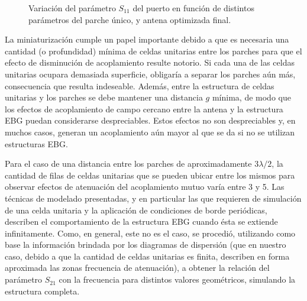 \begin{figure}[h]
	\centering 
	\hspace{30pt}
	\hspace{30pt}
	\hspace{30pt}
	\caption{Variación del parámetro $S_{11}$ del puerto en función de distintos parámetros del parche único, y antena optimizada final.}
	\label{fig:simulaciones-microstrip-1parche}
\end{figure}

La miniaturización cumple un papel importante debido a que es necesaria una cantidad (o profundidad) mínima de celdas unitarias entre los parches para que el efecto de disminución de acoplamiento resulte notorio. Si cada una de las celdas unitarias ocupara demasiada superficie, obligaría a separar los parches aún más, consecuencia que resulta indeseable. Además, entre la estructura de celdas unitarias y los parches se debe mantener una distancia $g$ mínima, de modo que los efectos de acoplamiento de campo cercano entre la antena y la estructura EBG puedan considerarse despreciables. Estos efectos no son despreciables y, en muchos casos, generan un acoplamiento aún mayor al que se da si no se utilizan estructuras EBG.

Para el caso de una distancia entre los parches de aproximadamente $3\lambda/2$, la cantidad de filas de celdas unitarias que se pueden ubicar entre los mismos para observar efectos de atenuación del acoplamiento mutuo varía entre 3 y 5. Las técnicas de modelado presentadas, y en particular las que requieren de simulación de una celda unitaria y la aplicación de condiciones de borde periódicas, describen el comportamiento de la estructura EBG cuando ésta se extiende infinitamente. Como, en general, este no es el caso, se procedió, utilizando como base la información brindada por los diagramas de dispersión (que en nuestro caso, debido a que la cantidad de celdas unitarias es finita, describen en forma aproximada las zonas frecuencia de atenuación), a obtener la relación del parámetro $S_{21}$ con la frecuencia para distintos valores geométricos, simulando la estructura completa.

